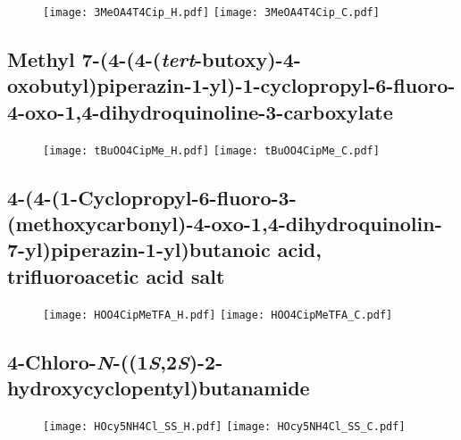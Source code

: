 \begin{figure}[H]
	\centering
		\texttt{[image: 3MeOA4T4Cip\_H.pdf]}
		\texttt{[image: 3MeOA4T4Cip\_C.pdf]}
\end{figure}

\subsection{Methyl 7\hyp{}(4\hyp{}(4\hyp{}(\textit{tert}\hyp{}butoxy)\hyp{}4\hyp{}oxobutyl)piperazin\hyp{}1\hyp{}yl)\hyp{}1\hyp{}cyclopropyl\hyp{}6\hyp{}fluoro\hyp{}4\hyp{}oxo\hyp{}1,4\hyp{}dihydroquinoline\hyp{}3\hyp{}carboxylate }

\begin{figure}[H]
	\centering
		\texttt{[image: tBuOO4CipMe\_H.pdf]}
		\texttt{[image: tBuOO4CipMe\_C.pdf]}
\end{figure}

\subsection{4\hyp{}(4\hyp{}(1\hyp{}Cyclopropyl\hyp{}6\hyp{}fluoro\hyp{}3\hyp{}(methoxycarbonyl)\hyp{}4\hyp{}oxo\hyp{}1,4\hyp{}dihydroquinolin\hyp{}7\hyp{}yl)piperazin\hyp{}1\hyp{}yl)butanoic acid, trifluoroacetic acid salt }

\begin{figure}[H]
	\centering
		\texttt{[image: HOO4CipMeTFA\_H.pdf]}
		\texttt{[image: HOO4CipMeTFA\_C.pdf]}
\end{figure}

\subsection{4\hyp{}Chloro\hyp{}\textit{N}\hyp{}((1\textit{S},2\textit{S})\hyp{}2\hyp{}hydroxycyclopentyl)butanamide }

\begin{figure}[H]
	\centering
		\texttt{[image: HOcy5NH4Cl\_SS\_H.pdf]}
		\texttt{[image: HOcy5NH4Cl\_SS\_C.pdf]}
\end{figure}

